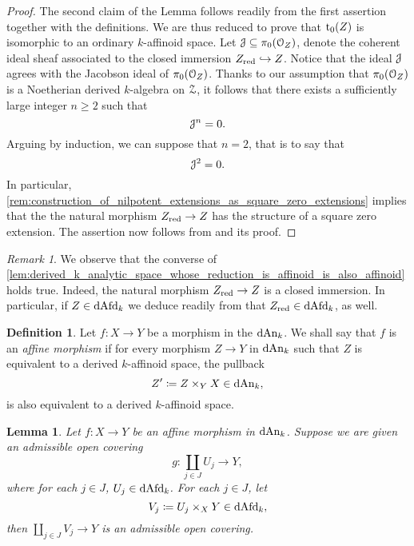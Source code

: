 \documentclass[10pt,a4paper,reqno]{amsart} %
\theoremstyle{plain}
\newtheorem{lem}[thm]{Lemma}
\theoremstyle{definition}
\newtheorem{defin}[thm]{Definition}
\theoremstyle{remark}
\newtheorem{rem}[thm]{Remark}
\numberwithin{equation}{section}
\begin{document}
\begin{proof} The second claim of the Lemma follows readily from the first assertion together with the definitions.
    We are thus reduced to prove that $\mathrm{t}_0(Z)$ is isomorphic to an ordinary $k$-affinoid space.
    Let $\mathcal J \subseteq \pi_0(\mathcal O_Z)$, denote the coherent ideal sheaf associated to the closed immersion $Z_{\mathrm{red}} \hookrightarrow Z$. Notice that the ideal $\mathcal J$
    agrees with the Jacobson ideal of $\pi_0(\mathcal O_Z)$. Thanks to our assumption that $\pi_0(\mathcal O_Z)$ is a Noetherian derived $k$-algebra on $\mathcal Z$, it follows that there exists
    a sufficiently large integer $n \ge 2$ such that
        \[
            \mathcal J^n = 0.  
        \]
    Arguing by induction, we can suppose that $n = 2$, that is to say that
        \[\mathcal J^2 = 0.\]
    In particular, \cref{rem:construction_of_nilpotent_extensions_as_square_zero_extensions} implies that the
    the natural morphism $Z_{\mathrm{red}} \to Z$ has the structure of a square zero extension.
    The assertion now follows from \cite[Proposition 6.1]{Porta_Yu_Representability}
    and its proof.
\end{proof}

\begin{rem}
    We observe that the converse of \cref{lem:derived_k_analytic_space_whose_reduction_is_affinoid_is_also_affinoid} holds true.
    Indeed, the natural morphism $Z_{\mathrm{red}} \to Z$ is a closed immersion. In particular, if $Z \in \mathrm{dAfd}_k$ we deduce readily from
    that $Z_{\mathrm{red}} \in \mathrm{dAfd}_k$, as well.
\end{rem}

\begin{defin}
    Let $f \colon X \to Y$ be a morphism in the \infcat $\mathrm{dAn}_k$. We shall say that $f$ is an \emph{affine morphism} if
    for every morphism $Z \to Y$ in $\mathrm{dAn}_k$ such that $Z$ is equivalent to a derived $k$-affinoid space, the pullback
        \[
            Z' \coloneqq Z \times_Y X \in \mathrm{dAn}_k,  
        \]
    is also equivalent to a derived $k$-affinoid space.
\end{defin}

\begin{lem} \label{lem:affine_morphisms_are_compatible_with_Zariski_localization_on_the_base}
    Let $f \colon X \to Y$ be an affine morphism in $\mathrm{dAn}_k$. Suppose we are given an admissible open covering
        \[
            g \colon \coprod_{j \in J} U_j \to Y,  
        \]
    where for each $j \in J$, $U_j \in \mathrm{dAfd}_k$. For each $j \in J$, let 
        \[
            V_j \coloneqq U_j \times_X Y \in \mathrm{dAfd}_k,  
        \]
    then $\coprod_{j \in J} V_j \to Y$ is an admissible open covering.
\end{lem}
\end{document}
